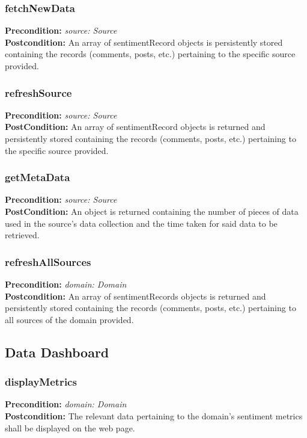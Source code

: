 \documentclass[12pt]{article}
\begin{document}
\subsubsection*{fetchNewData}
\textbf{Precondition:} \textit{source: Source} \\
\textbf{Postcondition:} An array of sentimentRecord objects is persistently stored containing the records (comments, posts, etc.) pertaining to the specific source provided.

\subsubsection*{refreshSource}
\textbf{Precondition:} \textit{source: Source} \\
\textbf{PostCondition:} An array of sentimentRecord objects is returned and persistently stored containing the records (comments, posts, etc.) pertaining to the specific source provided.

\subsubsection*{getMetaData}
\textbf{Precondition:} \textit{source: Source} \\
\textbf{PostCondition:} An object is returned containing the number of pieces of data used in the source's data collection and the time taken for said data to be retrieved.

\subsubsection*{refreshAllSources}
\textbf{Precondition:} \textit{domain: Domain} \\
\textbf{Postcondition:} An array of sentimentRecords objects is returned and persistently stored containing the records (comments, posts, etc.) pertaining to all sources of the domain provided.

\subsection{Data Dashboard}

\subsubsection*{displayMetrics}
\textbf{Precondition:} \textit{domain: Domain} \\
\textbf{Postcondition:} The relevant data pertaining to the domain's sentiment metrics shall be displayed on the web page.
\end{document}
